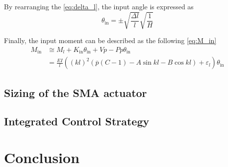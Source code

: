 By rearranging the \cref{eq:delta_l}, the input angle is expressed as
\begin{equation}\label{eq:theta_in}
 {\theta}_\textrm{in}=\pm \sqrt{\frac{\Delta l}{l}}\sqrt{\frac{1}{H}}
\end{equation}

Finally, the input moment can be described as the following \cref{eq:M_in}
\begin{equation}
\begin{split}
 M_\textrm{in} &\cong M_l+K_\textrm{in}{\theta }_\textrm{in}+Vp-Pp{\theta}_\textrm{in}\\
 &=\frac{EI}{l}\left({\left(kl\right)}^2\left(\overline{p}\left(C-1\right)-A\sin{kl}-B\cos{kl}\right)+{\varepsilon }_l\right){\theta}_\textrm{in}
 \label{eq:M_in}
\end{split}
\end{equation}

\subsection{Sizing of the SMA actuator}
\subsection{Integrated Control Strategy}
\section{Conclusion}
